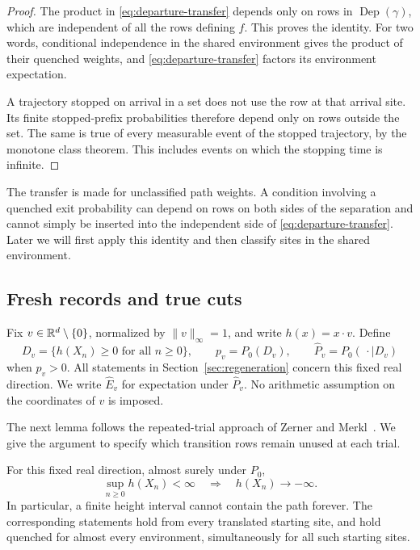 \begin{proof}
The product in \eqref{eq:departure-transfer} depends only on rows in
$\operatorname{Dep}(\gamma)$, which are independent of all the rows defining
$f$.  This proves the identity.  For two words, conditional independence in
the shared environment gives the product of their quenched weights, and
\eqref{eq:departure-transfer} factors its environment expectation.

A trajectory stopped on arrival in a set does not use the row at that
arrival site.  Its finite stopped-prefix probabilities therefore depend
only on rows outside the set.  The same is true of every measurable event
of the stopped trajectory, by the monotone class theorem.  This includes
events on which the stopping time is infinite.
\end{proof}

The transfer is made for unclassified path weights.  A condition involving
a quenched exit probability can depend on rows on both sides of the
separation and cannot simply be inserted into the independent side of
\eqref{eq:departure-transfer}.  Later we will first apply this identity and
then classify sites in the shared environment.

\subsection{Fresh records and true cuts}

Fix $v\in\mathbb R^d\setminus\{0\}$, normalized by $\|v\|_\infty=1$, and write
$h(x)=x\cdot v$.  Define
\[
 D_v=\{h(X_n)\ge0\text{ for all }n\ge0\},\qquad
 p_v=P_0(D_v),\qquad
 \widehat P_v=P_0(\,\cdot\mid D_v)
\]
when $p_v>0$.  All statements in Section~\ref{sec:regeneration} concern this fixed real
direction.  We write $\widehat E_v$ for expectation under
$\widehat P_v$.  No arithmetic assumption on the coordinates of $v$ is
imposed.

The next lemma follows the repeated-trial approach of Zerner and
Merkl~\cite[Lemma~4]{ZernerMerkl2001}. We give the argument to specify
which transition rows remain unused at each trial.

\begin{lemma}\label{lem:finite-supremum}
For this fixed real direction, almost surely under $P_0$,
\[
 \sup_{n\ge0}h(X_n)<\infty
 \quad\Longrightarrow\quad h(X_n)\longrightarrow-\infty.
\]
In particular, a finite height interval cannot contain the path forever.
The corresponding statements hold from every translated starting site,
and hold quenched for almost every environment, simultaneously for all
such starting sites.
\end{lemma}

